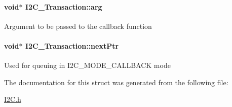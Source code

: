 \paragraph[{arg}]{\setlength{\rightskip}{0pt plus 5cm}void$\ast$ I2\+C\+\_\+\+Transaction\+::arg}\label{struct_i2_c___transaction_a29ec65addac2d4ef5d1235c2329e2fc1}
Argument to be passed to the callback function 
\paragraph[{next\+Ptr}]{\setlength{\rightskip}{0pt plus 5cm}void$\ast$ I2\+C\+\_\+\+Transaction\+::next\+Ptr}\label{struct_i2_c___transaction_a21755edd4d999d6041d303e269596371}
Used for queuing in I2\+C\+\_\+\+M\+O\+D\+E\+\_\+\+C\+A\+L\+L\+B\+A\+C\+K mode 

The documentation for this struct was generated from the following file\+:\begin{DoxyCompactItemize}
\item 
\hyperlink{_i2_c_8h}{I2\+C.\+h}\end{DoxyCompactItemize}

